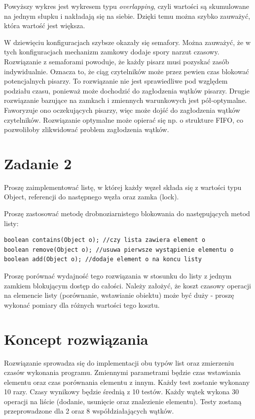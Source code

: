 \documentclass[12pt]{article}
\begin{document}
Powyższy wykres jest wykresem typu \emph{overlapping}, czyli wartości są skumulowane na jednym słupku i nakładają się na siebie. Dzięki temu można szybko zauważyć, która wartość jest większa.

W dziewięciu konfiguracjach szybsze okazały się semafory. Można zauważyć, że w tych konfiguracjach mechanizm zamkowy dodaje spory narzut czasowy. Rozwiązanie z semaforami powoduje, że każdy pisarz musi pozyskać zasób indywidualnie. Oznacza to, że ciąg czytelników może przez pewien czas blokować potencjalnych pisarzy. To rozwiązanie nie jest sprawiedliwe pod względem podziału czasu, ponieważ może dochodzić do zagłodzenia wątków pisarzy.
Drugie rozwiązanie bazujące na zamkach i zmiennych warunkowych jest pół-optymalne. Faworyzuje ono oczekujących pisarzy, więc może dojść do zagłodzenia wątków czytelników. 
Rozwiązanie optymalne może opierać się np. o strukture FIFO, co pozwoliłoby zlikwidować problem zagłodzenia wątków.

\newpage
\section{Zadanie 2}
Proszę zaimplementować listę, w której każdy węzeł składa się z wartości typu Object, referencji do następnego węzła oraz zamka (lock).

Proszę zastosować metodę drobnoziarnistego blokowania do następujących metod listy:
\begin{verbatim}
boolean contains(Object o); //czy lista zawiera element o
boolean remove(Object o); //usuwa pierwsze wystąpienie elementu o
boolean add(Object o); //dodaje element o na koncu listy  
\end{verbatim}

Proszę porównać wydajność tego rozwiązania w stosunku do listy z jednym zamkiem blokującym dostęp do całości. Należy założyć, że koszt czasowy operacji na elemencie listy (porównanie, wstawianie obiektu) może być duży - proszę wykonać pomiary dla różnych wartości tego kosztu.

\section{Koncept rozwiązania}
Rozwiązanie sprowadza się do implementacji obu typów list oraz zmierzeniu czasów wykonania programu. Zmiennymi parametrami będzie czas wstawiania elementu oraz czas porównania elementu z innym. Każdy test zostanie wykonany 10 razy. Czasy wynikowy będzie średnią z 10 testów. Każdy wątek wykona 30 operacji na liście (dodanie, usunięcie oraz znalezienie elementu). Testy zostaną przeprowadzone dla 2 oraz 8 współdziałających wątków.
\end{document}
